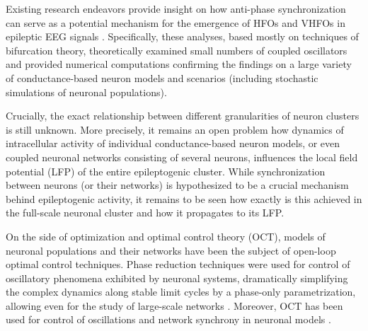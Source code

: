 \documentclass[a4paper,11pt]{scrartcl}
\begin{document}
Existing research endeavors provide insight on how anti-phase synchronization can serve as a potential mechanism for the emergence of HFOs and VHFOs in epileptic EEG signals \cite{Pribylova2024, Sevcik2024, Zathurecky2025}. Specifically, these analyses, based mostly on techniques of bifurcation theory, theoretically examined small numbers of coupled oscillators and provided numerical computations confirming the findings on a large variety of conductance-based neuron models and scenarios (including stochastic simulations of neuronal populations).

Crucially, the exact relationship between different granularities of neuron clusters is still unknown. More precisely, it remains an open problem how dynamics of intracellular activity of individual conductance-based neuron models, or even coupled neuronal networks consisting of several neurons, influences the local field potential (LFP) of the entire epileptogenic cluster. While synchronization between neurons (or their networks) is hypothesized to be a crucial mechanism behind epileptogenic activity, it remains to be seen how exactly is this achieved in the full-scale neuronal cluster and how it propagates to its LFP.

On the side of optimization and optimal control theory (OCT), models of neuronal populations \cite{Salfenmoser2022, Salfenmoser2024} and their networks \cite{Chouzouris2021} have been the subject of open-loop optimal control techniques. Phase reduction \cite{Zlotnik2012, Dasanayake2011, Pietras2019} techniques were used for control of oscillatory phenomena exhibited by neuronal systems, dramatically simplifying the complex dynamics along stable limit cycles by a phase-only parametrization, allowing even for the study of large-scale networks \cite{Bomela2023}. Moreover, OCT has been used for control of oscillations and network synchrony in neuronal models \cite{Ruths2014, Orieux2024, Popovych2006, Costa2024}.
\end{document}
